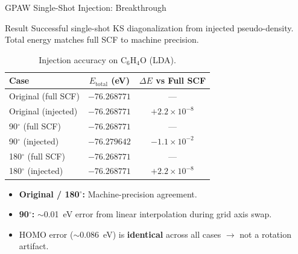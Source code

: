 \documentclass[aspectratio=169]{beamer}
\begin{document}
\begin{frame}{GPAW Single-Shot Injection: Breakthrough}
  \begin{alertblock}{Result}
    Successful single-shot KS diagonalization from injected pseudo-density. Total energy matches full SCF to machine precision.
  \end{alertblock}

  \scriptsize
  \begin{table}[h]
    \centering
    \caption{Injection accuracy on C$_6$H$_4$O (LDA).}
    \begin{tabular}{lcc}
      \toprule
      Case & $E_{\text{total}}$ (eV) & $\Delta E$ vs Full SCF \\
      \midrule
      Original (full SCF) & $-76.268771$ & --- \\
      Original (injected) & $-76.268771$ & $+2.2\times10^{-8}$ \\
      90$^\circ$ (full SCF) & $-76.268771$ & --- \\
      90$^\circ$ (injected) & $-76.279642$ & $-1.1\times10^{-2}$ \\
      180$^\circ$ (full SCF) & $-76.268771$ & --- \\
      180$^\circ$ (injected) & $-76.268771$ & $+2.2\times10^{-8}$ \\
      \bottomrule
    \end{tabular}
  \end{table}
  \vspace{-0.2cm}
  \begin{itemize}
    \item \textbf{Original / 180$^\circ$:} Machine-precision agreement.
    \item \textbf{90$^\circ$:} $\sim$0.01~eV error from linear interpolation during grid axis swap.
    \item HOMO error ($\sim$0.086~eV) is \textbf{identical} across all cases $\rightarrow$ not a rotation artifact.
  \end{itemize}
\end{frame}
\end{document}
